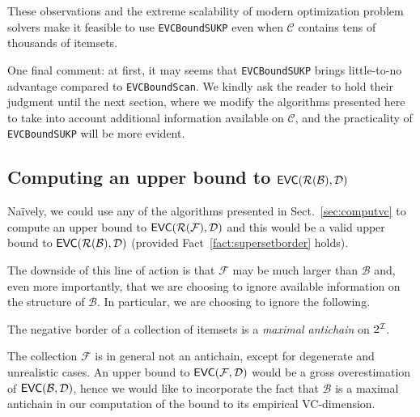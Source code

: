 These observations and the extreme scalability of modern optimization problem
solvers make it feasible to use \texttt{EVCBoundSUKP} even when $\mathcal{C}$
contains tens of thousands of itemsets.

One final comment: at first, it may seems that \texttt{EVCBoundSUKP} brings
little-to-no advantage compared to \texttt{EVCBoundScan}. We kindly ask the
reader to hold their judgment until the next section, where we modify the
algorithms presented here to take into account additional information available
on $\mathcal{C}$, and the practicality of \texttt{EVCBoundSUKP} will be more
evident.

\subsection{Computing an upper bound to $\mathsf{EVC}(\mathcal{R}(\mathcal{B}),{\cal D})$} 
\label{sec:vcbupper}

Na\"ively, we
could use any of the algorithms presented in Sect.~\ref{sec:computvc} to compute
an upper bound to $\mathsf{EVC}(\mathcal{R}(\mathcal{F}),{\cal D})$ and this would be a valid upper bound
to $\mathsf{EVC}(\mathcal{R}(\mathcal{B}),{\cal D})$ (provided Fact~\ref{fact:supersetborder} holds). 

The
downside of this line of action is that $\mathcal{F}$ may be much larger than
$\mathcal{B}$ and, even more importantly, that we are choosing to ignore
available information on the structure of $\mathcal{B}$. In particular, we are
choosing to ignore the following.

\begin{fact}
	The negative border of a collection of itemsets is a \emph{maximal
	antichain} on $2^{\cal I}$.
\end{fact}

The collection $\mathcal{F}$ is in general not an antichain, except for
degenerate and unrealistic cases. An upper bound to $\mathsf{EVC}(\mathcal{F},{\cal D})$
would be a gross overestimation of $\mathsf{EVC}(\mathcal{B},{\cal D})$, hence we would like
to incorporate the fact that $\mathcal{B}$ is a maximal antichain in our
computation of the bound to its empirical VC-dimension.


